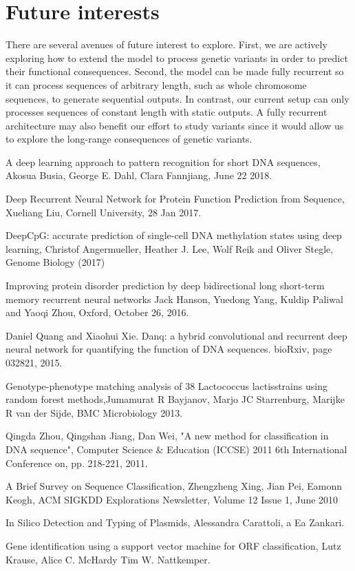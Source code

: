 \documentclass[conference]{IEEEtran}
\begin{document}
\section{Future interests}
There are several avenues of future interest to explore. First, we are actively exploring how to extend the model to process genetic variants in order to predict their functional consequences. Second, the model can be made fully recurrent so it can process sequences of arbitrary length, such as whole chromosome sequences, to generate sequential outputs.
In contrast, our current setup can only processes sequences of constant length with static outputs. A fully recurrent architecture may also benefit our effort to study variants since it would allow us to explore the long-range consequences of genetic variants.

\begin{thebibliography}{00}
\bibitem{} A deep learning approach to pattern
recognition for short DNA sequences, Akosua Busia, George E. Dahl, Clara Fannjiang, June 22 2018.

\bibitem{} Deep Recurrent Neural Network for Protein Function Prediction from Sequence, Xueliang Liu, Cornell University, 28 Jan 2017.

\bibitem{} DeepCpG: accurate prediction of single-cell
DNA methylation states using deep learning, Christof Angermueller, Heather J. Lee, Wolf Reik and Oliver Stegle, Genome Biology (2017)

\bibitem{} Improving protein disorder prediction by deep
bidirectional long short-term memory recurrent neural networks
Jack Hanson, Yuedong Yang, Kuldip Paliwal and Yaoqi Zhou, Oxford, October 26, 2016.

\bibitem{} Daniel Quang and Xiaohui Xie. Danq: a hybrid convolutional and recurrent deep neural network for quantifying the function of DNA sequences. bioRxiv, page 032821, 2015.

\bibitem{} Genotype-phenotype matching analysis of 38 Lactococcus lactisstrains using random forest methods,Jumamurat R Bayjanov, Marjo JC Starrenburg, Marijke R van der Sijde,
BMC Microbiology 2013.

\bibitem{} Qingda Zhou, Qingshan Jiang, Dan Wei, "A new method for classification in DNA sequence", Computer Science \& Education (ICCSE) 2011 6th International Conference on, pp. 218-221, 2011.

\bibitem{} A Brief Survey on Sequence Classification, Zhengzheng Xing, Jian Pei, Eamonn Keogh, ACM SIGKDD Explorations Newsletter, Volume 12 Issue 1, June 2010

\bibitem{} In Silico Detection and Typing of Plasmids,  Alessandra Carattoli, a Ea Zankari.

\bibitem{} Gene identification using a support vector machine for ORF classification, Lutz Krause, Alice C. McHardy  Tim W. Nattkemper.

\end{thebibliography}
\vspace{12pt}
\end{document}
